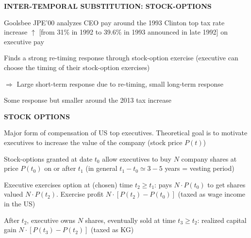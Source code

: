 \documentclass[landscape]{slides}
\begin{document}
\begin{slide}

\end{slide}

\begin{slide}

\end{slide}

%
%
%
%

\begin{slide}
\begin{center}
{\bf INTER-TEMPORAL SUBSTITUTION: STOCK-OPTIONS}
\end{center}
Goolsbee JPE'00 analyzes CEO pay around the 1993 Clinton top tax rate increase
$\uparrow$ [from 31\% in 1992 to 39.6\% in 1993 announced
in late 1992] on executive pay

Finds a strong re-timing response through stock-option exercise (executive can choose
the timing of their stock-option exercises)

$\Rightarrow$ Large short-term response due to re-timing, small long-term response

Some response but smaller around the 2013 tax increase

\end{slide}


\begin{slide}
\begin{center}
{\bf STOCK OPTIONS}
\end{center}
Major form of compensation of US top executives. Theoretical goal
is to motivate executives to increase the value of the company
(stock price $P(t)$)

Stock-options granted at date $t_0$ allow executives to buy $N$
company shares at price $P(t_0)$ on or after $t_1$ (in general
$t_1-t_0 \simeq 3-5$ years = vesting period)

Executive exercises option at (chosen) time $t_2 \geq t_1$: pays $N
\cdot P(t_0)$ to get shares valued $N \cdot P(t_2)$. Exercise
profit $N \cdot [P(t_2)-P(t_0)]$ (taxed as wage income in
the US)

After $t_2$, executive owns $N$ shares, eventually sold at time
$t_3 \geq t_2$: realized capital gain $N \cdot [P(t_3)-P(t_2)]$ (taxed
as KG)
\end{slide}
\end{document}
